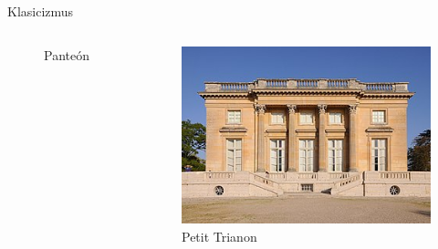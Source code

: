 \documentclass[dvipsnames]{beamer}
\begin{document}
\begin{frame}{Klasicizmus}
\begin{itemize}
\begin{columns}
\begin{figure}
				      \caption{Panteón}
			      \end{figure}
			      \begin{figure}
				      \includegraphics[scale=0.3]{maly}
				      \caption{Petit Trianon}
			      \end{figure}

		      \end{columns}
	\end{itemize}
\end{frame}
\end{document}
